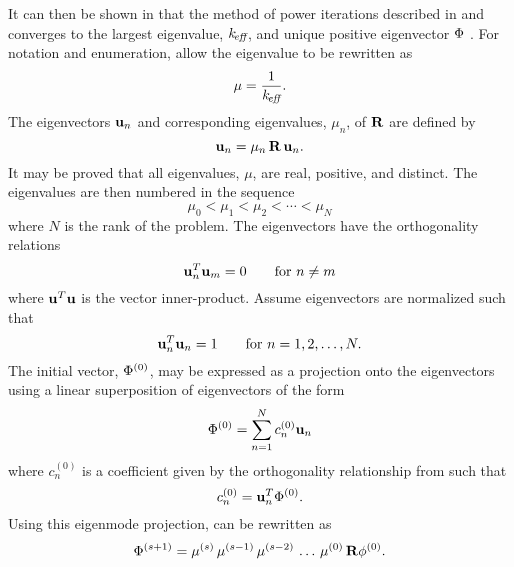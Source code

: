     It can then be shown in that the method of power iterations described in 
     and 
    converges to the largest eigenvalue, $k_{\!\mbox{\scriptsize \em eff}}$, and unique positive 
    eigenvector $\Phi$ \cite{nakamura}. For notation and enumeration, allow the 
    eigenvalue to be rewritten as
    \begin{equation}
      \label{eq:mu}
      \mu = \frac{1}{k_{\!\mbox{\scriptsize \em eff}}}.
    \end{equation}
    The eigenvectors $\mathbf{u}_n$ and
    corresponding eigenvalues, $\mu_n$, of $\mathbf{R}$ are defined by
    \begin{equation}
      \label{eq:eigen_definition}
      \mathbf{u}_n = \mu_n \, \mathbf{R} \, \mathbf{u}_n.
    \end{equation}
    It may be proved that all eigenvalues, $\mu$, are real, positive, and 
    distinct. The eigenvalues are then numbered in the sequence
    \begin{equation}
      \label{eq:eigen_order}
      \mu_0 < \mu_1 < \mu_2 < \cdots < \mu_N
    \end{equation}
    where $N$ is the rank of the problem. The eigenvectors have the 
    orthogonality relations
    \begin{equation}
      \label{eq:eigen_orthogonality}
      \mathbf{u}^T_n \mathbf{u}_m = 0  \qquad \text{for } n \ne m
    \end{equation}
    where $\mathbf{u}^T \mathbf{u}$ is the vector inner-product. Assume eigenvectors are
    normalized such that
    \begin{equation}
      \label{eq:eigen_normalization}
      \mathbf{u}_n^T \mathbf{u}_n = 1 \qquad \text{for } n = 1, 2, \ldots, N.
    \end{equation}
    The initial vector, $\Phi^{(0)}$, may be expressed as a projection onto the
    eigenvectors using a linear superposition of eigenvectors of the form
    \begin{equation}
      \label{eq:eigen_projection}
      \Phi^{(0)} = \sum_{n=1}^{N} c_n^{(0)} \mathbf{u}_n
    \end{equation}
    where $c_n^{(0)}$ is a coefficient given by the orthogonality relationship
    from  such that
    \begin{equation}
      \label{eq:eigen_cn}
      c_n^{(0)} = \mathbf{u}_n^T \Phi^{(0)}.
    \end{equation}
    Using this eigenmode projection,  can be
    rewritten as 
    \begin{equation}
      \label{eq:phi_expand_begin}
      \Phi^{(s+1)} = \mu^{(s)} \, \mu^{(s-1)} \, \mu^{(s-2)} \, 
        \ldots \, \mu^{(0)} \, \mathbf{R} \phi^{(0)}.
    \end{equation}
